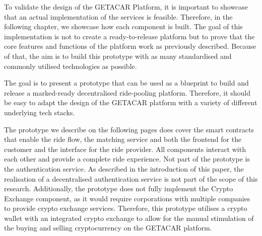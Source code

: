 To validate the design of the GETACAR Platform, it is important to showcase that an actual implementation of the services is feasible. Therefore, in the following chapter, we showcase how each component is built. The goal of this implementation is not to create a ready-to-release platform but to prove that the core features and functions of the platform work as previously described. Because of that, the aim is to build this prototype with as many standardised and commonly utilised technologies as possible. 

The goal is to present a prototype that can be used as a blueprint to build and release a marked-ready decentralised ride-pooling platform. Therefore, it should be easy to adapt the design of the GETACAR platform with a variety of different underlying tech stacks.

The prototype we describe on the following pages does cover the smart contracts that enable the ride flow, the matching service and both the frontend for the customer and the interface for the ride provider. All components interact with each other and provide a complete ride experience. Not part of the prototype is the authentication service. As described in the introduction of this paper, the realisation of a decentralised authentication service is not part of the scope of this research. Additionally, the prototype does not fully implement the Crypto Exchange component, as it would require corporations with multiple companies to provide crypto exchange services. Therefore, this prototype utilises a crypto wallet with an integrated crypto exchange to allow for the manual stimulation of the buying and selling cryptocurrency on the GETACAR platform.
